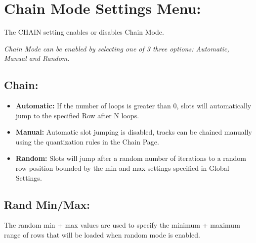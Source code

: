 \chapter{Chain Mode Settings Menu:}
The CHAIN setting enables or disables Chain Mode.


\textit{Chain Mode can be enabled by selecting one of 3 three options: Automatic, Manual and Random.}
\\
\section{Chain:}
\begin{itemize}
\item \textbf{Automatic:} If the number of loops is greater than 0, slots will automatically jump to the specified Row after N loops.
\item \textbf{Manual:} Automatic slot jumping is disabled, tracks can be chained manually using the quantization rules in the Chain Page.
\item \textbf{Random:} Slots will jump after a random number of iterations to a random row position bounded by the min and max settings specified in Global Settings.
\end{itemize}
\section{Rand Min/Max:} The random min + max values are used to specify the minimum + maximum range of rows that will be loaded when random mode is enabled.
